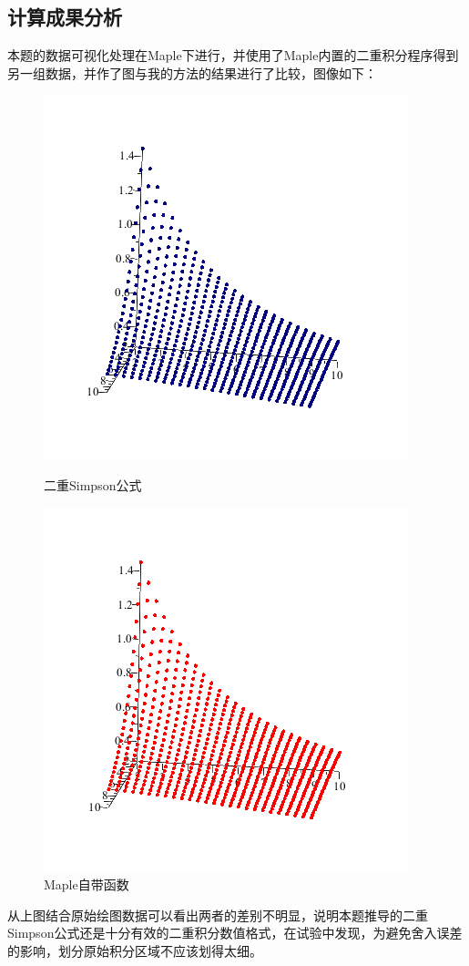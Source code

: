 \documentclass[10pt,a4paper]{ctexart}
\begin{document}
\subsection{计算成果分析}
本题的数据可视化处理在Maple下进行，并使用了Maple内置的二重积分程序得到另一组数据，并作了图与我的方法的结果进行了比较，图像如下：
\begin{figure}[htbp]
\centering
\begin{minipage}[t]{1\textwidth}
\centering
\includegraphics{doubleSimpson.png}
\caption{二重Simpson公式}
\end{minipage}
\begin{minipage}[t]{1\textwidth}
\centering
\includegraphics{doubleSimpson1.png}
\caption{Maple自带函数}
\end{minipage}
\end{figure}
从上图结合原始绘图数据可以看出两者的差别不明显，说明本题推导的二重Simpson公式还是十分有效的二重积分数值格式，在试验中发现，为避免舍入误差的影响，划分原始积分区域不应该划得太细。
\end{document}
